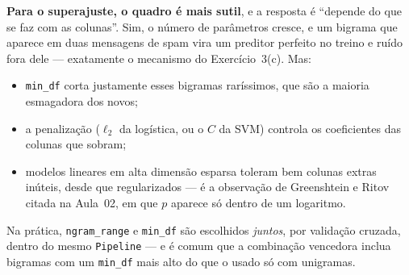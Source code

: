 \documentclass[11pt,a4paper]{article}
\begin{document}
\begin{solucao}
\textbf{Para o superajuste, o quadro é mais sutil}, e a resposta é ``depende do
que se faz com as colunas''. Sim, o número de parâmetros cresce, e um bigrama que
aparece em duas mensagens de spam vira um preditor perfeito no treino e ruído
fora dele --- exatamente o mecanismo do Exercício~3(c). Mas:
\begin{itemize}[leftmargin=1.4cm]
  \item \texttt{min\_df} corta justamente esses bigramas raríssimos, que são a
        maioria esmagadora dos novos;
  \item a penalização ($\ell_2$ da logística, ou o $C$ da SVM) controla os
        coeficientes das colunas que sobram;
  \item modelos lineares em alta dimensão esparsa toleram bem colunas extras
        inúteis, desde que regularizados --- é a observação de Greenshtein e
        Ritov citada na Aula~02, em que $p$ aparece só dentro de um logaritmo.
\end{itemize}
Na prática, \texttt{ngram\_range} e \texttt{min\_df} são escolhidos \emph{juntos},
por validação cruzada, dentro do mesmo \texttt{Pipeline} --- e é comum que a
combinação vencedora inclua bigramas com um \texttt{min\_df} mais alto do que o
usado só com unigramas.
\end{solucao}
\end{document}
